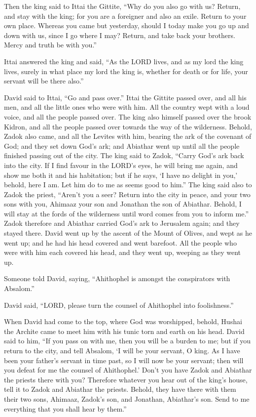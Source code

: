  Then the king said to Ittai the Gittite, ``Why do you
also go with us? Return, and stay with the king; for you are a foreigner
and also an exile. Return to your own place.  Whereas you
came but yesterday, should I today make you go up and down with us,
since I go where I may? Return, and take back your brothers. Mercy and
truth be with you.''

 Ittai answered the king and said, ``As the LORD lives,
and as my lord the king lives, surely in what place my lord the king is,
whether for death or for life, your servant will be there also.''

 David said to Ittai, ``Go and pass over.'' Ittai the
Gittite passed over, and all his men, and all the little ones who were
with him.  All the country wept with a loud voice, and
all the people passed over. The king also himself passed over the brook
Kidron, and all the people passed over towards the way of the
wilderness.  Behold, Zadok also came, and all the Levites
with him, bearing the ark of the covenant of God; and they set down
God's ark; and Abiathar went up until all the people finished passing
out of the city.  The king said to Zadok, ``Carry God's
ark back into the city. If I find favour in the LORD's eyes, he will
bring me again, and show me both it and his habitation; 
but if he says, `I have no delight in you,' behold, here I am. Let him
do to me as seems good to him.''  The king said also to
Zadok the priest, ``Aren't you a seer? Return into the city in peace,
and your two sons with you, Ahimaaz your son and Jonathan the son of
Abiathar.  Behold, I will stay at the fords of the
wilderness until word comes from you to inform me.'' 
Zadok therefore and Abiathar carried God's ark to Jerusalem again; and
they stayed there.  David went up by the ascent of the
Mount of Olives, and wept as he went up; and he had his head covered and
went barefoot. All the people who were with him each covered his head,
and they went up, weeping as they went up.

 Someone told David, saying, ``Ahithophel is amongst the
conspirators with Absalom.''

David said, ``LORD, please turn the counsel of Ahithophel into
foolishness.''

 When David had come to the top, where God was
worshipped, behold, Hushai the Archite came to meet him with his tunic
torn and earth on his head.  David said to him, ``If you
pass on with me, then you will be a burden to me;  but if
you return to the city, and tell Absalom, `I will be your servant, O
king. As I have been your father's servant in time past, so I will now
be your servant; then will you defeat for me the counsel of Ahithophel.'
 Don't you have Zadok and Abiathar the priests there with
you? Therefore whatever you hear out of the king's house, tell it to
Zadok and Abiathar the priests.  Behold, they have there
with them their two sons, Ahimaaz, Zadok's son, and Jonathan, Abiathar's
son. Send to me everything that you shall hear by them.''

